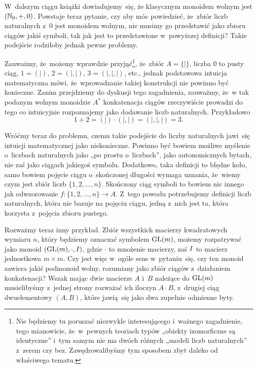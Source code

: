\documentclass[a4paper,11pt]{article}
\begin{document}
W~dalszym ciągu książki dowiadujemy~się, że klasycznym monoidem wolnym
jest $( \mathbb{N}_{ 0 }, +, 0 )$. Powstaje teraz pytanie, czy aby móc
powiedzieć, że~zbiór liczb naturalnych z~$0$ jest monoidem wolnym, nie
musimy go przedstawić jako zbioru ciągów jakiś symboli, tak jak jest
to przedstawione w~powyższej definicji? Takie podejście rodziłoby
jednak pewne problemy.

Zauważmy, że~możemy wprawdzie przyjąć\footnote{Nie będziemy tu
  poruszać niezwykle interesującego i~ważnego zagadnienie, tego
  mianowicie, że~w~pewnych teoriach typów „obiekty izomorficzne są
  identyczne” i~tym samym nie ma dwóch różnych „modeli liczb
  naturalnych” z~zerem czy bez. Zawędrowalibyśmy tym sposobem zbyt
  daleko od właściwego tematu.}, że~zbiór $A = \{ | \}$, liczba $0$ to
pusty ciąg, $1 = ( | )$, $2 = ( |, | )$, $3 = ( |, |, | )$, etc.,
jednak podstawowa intuicja matematyczna mówi, że~wprowadzanie takiej
konstrukcji nie powinno być konieczne. Zanim przejdziemy do dyskusji
tego zagadnienia, zauważmy, że~w tak podanym wolnym monoidzie
$A^{ * }$ konkatenacja ciągów rzeczywiście prowadzi do tego co
intuicyjnie rozpoznajemy jako dodawanie liczb naturalnych. Przykładowo
\begin{equation}
  \label{eq:Forys-Forys-06}
  1 + 2 = ( | ) \cdot ( |, | ) = ( |, |, | ) = 3.
\end{equation}

Wróćmy teraz do problemu, czemu takie podejście do liczby naturalnych
jawi~się intuicji matematycznej jako niekonieczne. Powinno być bowiem
możliwe myślenie o~liczbach naturalnych jako „po prostu o~liczbach”,
jako autonomicznych bytach, nie zaś jako ciągach jakiegoś symbolu.
Dodatkowo, taka definicji to błędne koło, samo bowiem pojęcie ciągu
o~skończonej długości wymaga uznania, że~wiemy czym jest zbiór liczb
$\{ 1, 2, \ldots, n \}$. Skończony ciąg symboli to bowiem nic innego
jak odwzorowanie $f : \{ 1, 2, \ldots, n \} \to A$. Z~tego powodu
potrzebujemy definicji liczb naturalnych, która nie bazuje na pojęciu
ciągu, jedną z~nich jest ta, która korzysta z~pojęcia zbioru pustego.

Rozważmy teraz inny przykład. Zbiór wszystkich macierzy kwadratowych
wymiaru $n$, który będziemy oznaczać symbolem $\mathrm{GL}( m )$, możemy
rozpatrywać jako monoid $( \mathrm{GL}( m ), \cdot, I )$, gdzie $\cdot$
to mnożenie macierzy, zaś $I$ to macierz jednostkowa
$m \times m$. Czy jest więc w~ogóle sens w~pytaniu~się, czy ten monoid
zawiera jakiś podmonoid wolny, rozumiany jako zbiór ciągów
z~działaniem konkatenacji? Wszak mając dwie macierze $A$ i~$B$
należące do $\mathrm{GL}( m )$ musielibyśmy z~jednej strony rozważać ich
iloczyn $A \cdot B$, z~drugiej ciąg dwuelementowy $( A, B )$, które
jawią~się jako dwa zupełnie odmienne byty.
\end{document}
